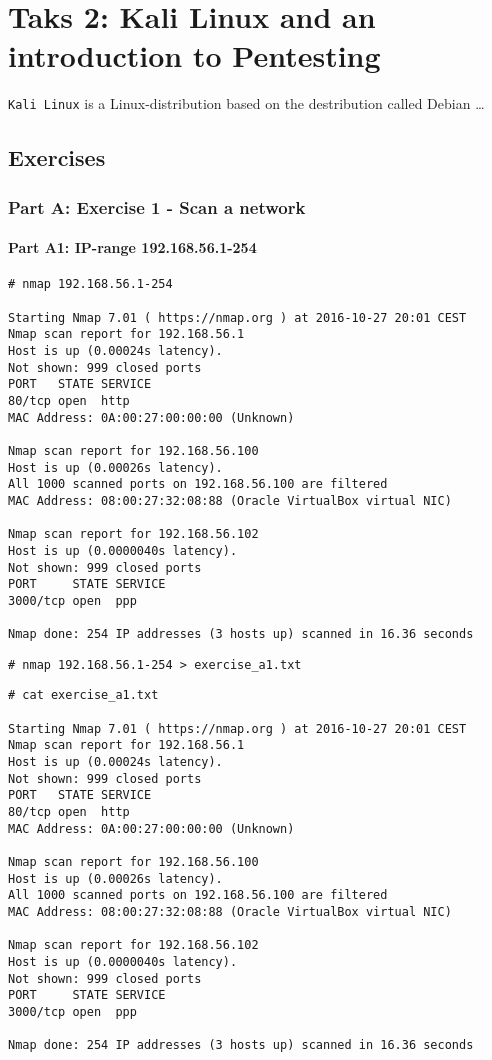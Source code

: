 \section{Taks 2: Kali Linux and an introduction to Pentesting}
\texttt{Kali Linux} is a Linux-distribution based on the destribution
called Debian\cite{KALIDEBIAN} \dots

\subsection{Exercises}
\subsubsection{Part A: Exercise 1 - Scan a network}
\paragraph{Part A1: IP-range 192.168.56.1-254}
\begin{lstlisting}[numbers=none, language={}, frame=bt]
# nmap 192.168.56.1-254

Starting Nmap 7.01 ( https://nmap.org ) at 2016-10-27 20:01 CEST
Nmap scan report for 192.168.56.1
Host is up (0.00024s latency).
Not shown: 999 closed ports
PORT   STATE SERVICE
80/tcp open  http
MAC Address: 0A:00:27:00:00:00 (Unknown)

Nmap scan report for 192.168.56.100
Host is up (0.00026s latency).
All 1000 scanned ports on 192.168.56.100 are filtered
MAC Address: 08:00:27:32:08:88 (Oracle VirtualBox virtual NIC)

Nmap scan report for 192.168.56.102
Host is up (0.0000040s latency).
Not shown: 999 closed ports
PORT     STATE SERVICE
3000/tcp open  ppp

Nmap done: 254 IP addresses (3 hosts up) scanned in 16.36 seconds
\end{lstlisting}

\begin{lstlisting}[numbers=none, language={}, frame=bt]
# nmap 192.168.56.1-254 > exercise_a1.txt
\end{lstlisting}

\begin{lstlisting}[numbers=none, language={}, frame=bt]
# cat exercise_a1.txt

Starting Nmap 7.01 ( https://nmap.org ) at 2016-10-27 20:01 CEST
Nmap scan report for 192.168.56.1
Host is up (0.00024s latency).
Not shown: 999 closed ports
PORT   STATE SERVICE
80/tcp open  http
MAC Address: 0A:00:27:00:00:00 (Unknown)

Nmap scan report for 192.168.56.100
Host is up (0.00026s latency).
All 1000 scanned ports on 192.168.56.100 are filtered
MAC Address: 08:00:27:32:08:88 (Oracle VirtualBox virtual NIC)

Nmap scan report for 192.168.56.102
Host is up (0.0000040s latency).
Not shown: 999 closed ports
PORT     STATE SERVICE
3000/tcp open  ppp

Nmap done: 254 IP addresses (3 hosts up) scanned in 16.36 seconds
\end{lstlisting}

